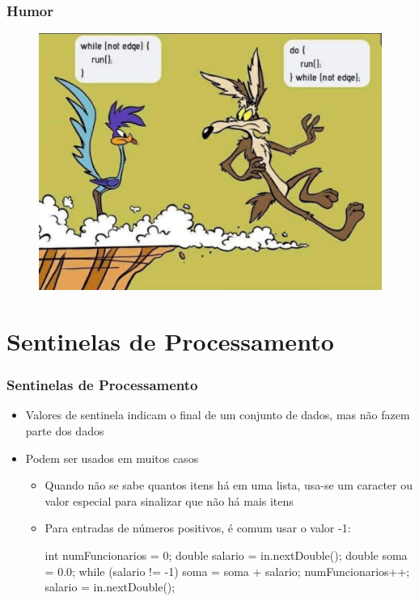 \documentclass[xcolor={dvipsnames,table},aspectratio=169]{beamer}
\begin{document}
\begin{frame}
\begin{columns}[T]
\begin{column}{0.5\linewidth}
\begin{center}
\begin{figure}[h]
\end{figure}
\end{center}
	\end{column}
\end{columns}

\end{frame}

\begin{frame}\frametitle{Humor}
\begin{figure}[h]
	\includegraphics[height=0.7\paperheight,center]{pucrs-ep-fprog-unidade_04-lacos-laminas-while_vs_do_while.jpg}
\end{figure}
\end{frame}

\section{Sentinelas de Processamento}

\begin{frame}[fragile]\frametitle{Sentinelas de Processamento}
\begin{itemize}
	\item Valores de sentinela indicam o final de um conjunto de dados, mas não fazem parte dos dados
	\item Podem ser usados em muitos casos
	\begin{itemize}
		\item Quando não se sabe quantos itens há em uma lista, usa-se um caracter ou valor especial para sinalizar que não há mais itens
		\item Para entradas de números positivos, é comum usar o valor -1:
\begin{javacode}
int numFuncionarios = 0;
double salario = in.nextDouble();
double soma = 0.0;
while (salario != -1) {
   soma = soma + salario;
   numFuncionarios++;
   salario = in.nextDouble();
}	
\end{javacode}
	\end{itemize}
\end{itemize}
\end{frame}
\end{document}
